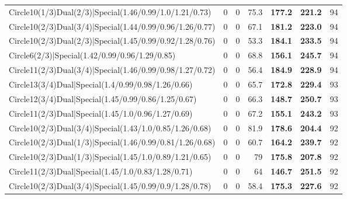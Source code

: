 \begin{tabular}{lrrrllr}
 Circle10(1/3)Dual(2/3)|Special(1.46/0.99/1.0/1.21/0.73)        &          0   &            0   &          75.3 & \textbf{177.2} & \textbf{221.2} &           94 \\
 Circle10(2/3)Dual(3/4)|Special(1.44/0.99/0.96/1.26/0.77)       &          0   &            0   &          67.1 & \textbf{181.2} & \textbf{223.0} &           94 \\
 Circle10(2/3)Dual(2/3)|Special(1.45/0.99/0.92/1.28/0.76)       &          0   &            0   &          53.3 & \textbf{184.1} & \textbf{233.5} &           94 \\
 Circle6(2/3)|Special(1.42/0.99/0.96/1.29/0.85)                 &          0   &            0   &          68.8 & \textbf{156.1} & \textbf{245.7} &           94 \\
 Circle11(2/3)Dual(3/4)|Special(1.46/0.99/0.98/1.27/0.72)       &          0   &            0   &          56.4 & \textbf{184.9} & \textbf{228.9} &           94 \\
 Circle13(3/4)Dual|Special(1.4/0.99/0.98/1.26/0.66)             &          0   &            0   &          65.7 & \textbf{172.8} & \textbf{229.4} &           93 \\
 Circle12(3/4)Dual|Special(1.45/0.99/0.86/1.25/0.67)            &          0   &            0   &          66.3 & \textbf{148.7} & \textbf{250.7} &           93 \\
 Circle11(2/3)Dual|Special(1.45/1.0/0.96/1.27/0.69)             &          0   &            0   &          67.2 & \textbf{155.1} & \textbf{243.2} &           93 \\
 Circle10(2/3)Dual(3/4)|Special(1.43/1.0/0.85/1.26/0.68)        &          0   &            0   &          81.9 & \textbf{178.6} & \textbf{204.4} &           92 \\
 Circle10(2/3)Dual(1/3)|Special(1.46/0.99/0.81/1.26/0.68)       &          0   &            0   &          60.7 & \textbf{164.2} & \textbf{239.7} &           92 \\
 Circle10(2/3)Dual(1/3)|Special(1.45/1.0/0.89/1.21/0.65)        &          0   &            0   &          79   & \textbf{175.8} & \textbf{207.8} &           92 \\
 Circle11(2/3)Dual|Special(1.45/1.0/0.83/1.28/0.71)             &          0   &            0   &          64   & \textbf{146.7} & \textbf{251.5} &           92 \\
 Circle10(2/3)Dual(3/4)|Special(1.45/0.99/0.9/1.28/0.78)        &          0   &            0   &          58.4 & \textbf{175.3} & \textbf{227.6} &           92 \\

\end{tabular}
